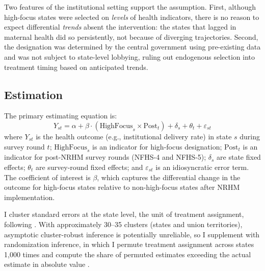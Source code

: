 \documentclass[12pt]{article}
\begin{document}
Two features of the institutional setting support the assumption. First, although high-focus states were selected on \emph{levels} of health indicators, there is no reason to expect differential \emph{trends} absent the intervention: the states that lagged in maternal health did so persistently, not because of diverging trajectories. Second, the designation was determined by the central government using pre-existing data and was not subject to state-level lobbying, ruling out endogenous selection into treatment timing based on anticipated trends.

\subsection{Estimation}

The primary estimating equation is:
\begin{equation}
Y_{st} = \alpha + \beta \cdot (\text{HighFocus}_s \times \text{Post}_t) + \delta_s + \theta_t + \varepsilon_{st}
\label{eq:did}
\end{equation}
where $Y_{st}$ is the health outcome (e.g., institutional delivery rate) in state $s$ during survey round $t$; $\text{HighFocus}_s$ is an indicator for high-focus designation; $\text{Post}_t$ is an indicator for post-NRHM survey rounds (NFHS-4 and NFHS-5); $\delta_s$ are state fixed effects; $\theta_t$ are survey-round fixed effects; and $\varepsilon_{st}$ is an idiosyncratic error term. The coefficient of interest is $\beta$, which captures the differential change in the outcome for high-focus states relative to non-high-focus states after NRHM implementation.

I cluster standard errors at the state level, the unit of treatment assignment, following \citet{bertrand2004much}. With approximately 30--35 clusters (states and union territories), asymptotic cluster-robust inference is potentially unreliable, so I supplement with randomization inference, in which I permute treatment assignment across states 1,000 times and compute the share of permuted estimates exceeding the actual estimate in absolute value \citep{fisher1935design}.
\end{document}
